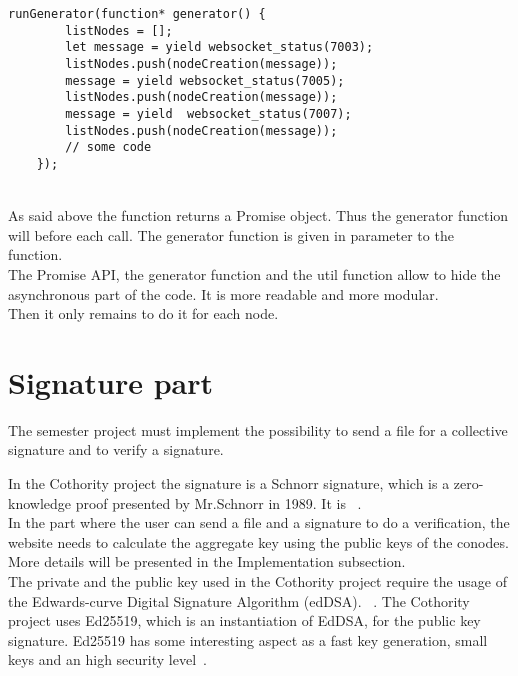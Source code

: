 \documentclass[11pt, a4paper, twoside, openright]{book} %
\begin{document}
\begin{lstlisting}[caption={Extract from the project's code reaching conodes at port 7003, 7005 and 7007}, captionpos=b]
  runGenerator(function* generator() {
        listNodes = [];
        let message = yield websocket_status(7003);
        listNodes.push(nodeCreation(message));
        message = yield websocket_status(7005);
        listNodes.push(nodeCreation(message));
        message = yield  websocket_status(7007);
        listNodes.push(nodeCreation(message));
        // some code
    });
\end{lstlisting}
\leavevmode \\
As said above the  function returns a Promise object. Thus
the generator function  will  before each  call.
The generator function is given in parameter to the  function.\\
The Promise API, the generator function and the util function  allow to hide
the asynchronous part of the code. It is more readable and more modular.\\


Then it only remains to do it for each node.

\section{Signature part}
The semester project must implement the possibility to send a file for a collective signature
and to verify a signature.


In the Cothority project the signature is a Schnorr signature, which is a zero-knowledge proof presented
by Mr.Schnorr in 1989. It is ~\cite{wikiSchnorr}.\\
In the part where the user can send a file and a signature to do a verification,
the website needs to calculate the aggregate key using the public keys of the conodes.
More details will be presented in the Implementation subsection.\\
The private and the public key used in the Cothority project require the usage of
the Edwards-curve Digital Signature Algorithm (edDSA).
~\cite{edDSA}.
The Cothority project uses Ed25519, which is an instantiation of EdDSA, for the
public key signature. Ed25519 has some interesting aspect as a fast key generation,
small keys and an high security level~\cite{ed25519}.\\
\end{document}
